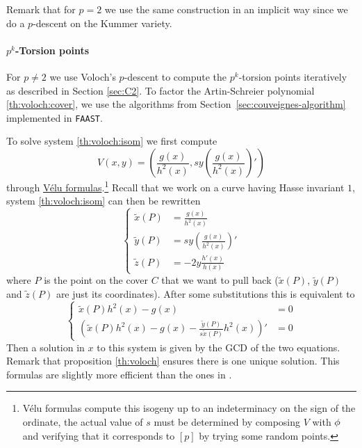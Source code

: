   Remark that
for $p=2$ we use the same construction in an implicit way since we do
a $p$-descent on the Kummer variety.


\paragraph{$p^k$-Torsion points}
For $p\ne2$ we use Voloch's $p$-descent to compute the $p^k$-torsion
points iteratively as described in Section \ref{sec:C2}. To factor the
Artin-Schreier polynomial \eqref{th:voloch:cover}, we use the
algorithms from Section~\ref{sec:couveignes-algorithm} implemented in
\texttt{FAAST}.

To solve system \eqref{th:voloch:isom} we first compute
\begin{equation*}
  V(x,y) = \left(\frac{g(x)}{h^2(x)}, 
    sy\left(\frac{g(x)}{h^2(x)}\right)'\right)
\end{equation*}
through \hyperref[sec:velu-formulas]{Vélu formulas}.\footnote{Vélu
  formulas compute this isogeny up to an indeterminacy on the sign of
  the ordinate, the actual value of $s$ must be determined by
  composing $V$ with $\phi$ and verifying that it corresponds to
  $[p]$ by trying some random points.} Recall that we work on a curve
having Hasse invariant $1$, system \eqref{th:voloch:isom} can then be
rewritten
\begin{equation*}
  \left\{
    \begin{aligned}
      \tilde{x}(P) &= \frac{g(x)}{h^2(x)}\\
      \tilde{y}(P) &= sy\left(\frac{g(x)}{h^2(x)}\right)'\\
      \tilde{z}(P) &= -2y\frac{h'(x)}{h(x)}
    \end{aligned}
  \right.
\end{equation*}
where $P$ is the point on the cover $C$ that we want to pull back
($\tilde{x}(P)$, $\tilde{y}(P)$ and $\tilde{z}(P)$ are just its
coordinates). After some substitutions this is equivalent to
\begin{equation*}
  \left\{
    \begin{aligned}
      \tilde{x}(P)h^2(x) - g(x) &= 0\\
      \left(\tilde{x}(P)h^2(x) - g(x) - \frac{\tilde{y}(P)}{s\tilde{x}(P)}h^2(x)\right)' &= 0
    \end{aligned}
  \right.
\end{equation*}
Then a solution in $x$ to this system is given by the GCD of the two
equations. Remark that proposition \ref{th:voloch} ensures there is
one unique solution. This formulas are slightly more efficient than
the ones in \cite[$\S$6.2]{lercier-algorithmique}.

